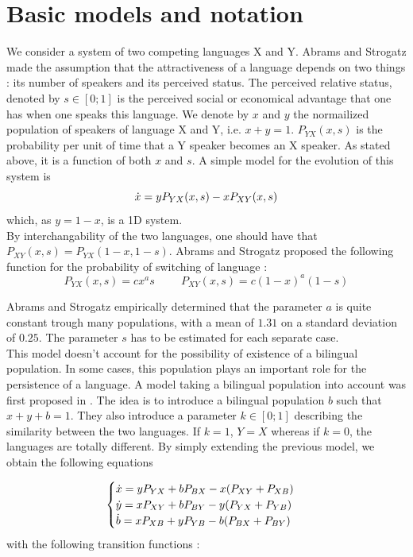 \documentclass{article}
\begin{document}
\section{Basic models and notation}
\label{sec:basic}
We consider a system of two competing languages X and Y.
Abrams and Strogatz made the assumption that the attractiveness of a language depends on two things : its number of speakers and its perceived status.
The perceived relative status, denoted by $s \in [0;1]$ is the perceived social or economical advantage that one has when one speaks this language.
We denote by $x$ and $y$ the normailized population of speakers of language X and Y, i.e. $x+y=1$. $P_{YX}(x, s)$ is the probability per unit of time that a Y speaker becomes an X speaker. As stated above, it is a function of both $x$ and $s$.
A simple model for the evolution of this system is
\begin{equation}
\label{eq:1dsimple}
\dot{x} = yP_{YX}(x, s) - xP_{XY}(x, s)
\end{equation}
which, as $y = 1-x$, is a 1D system. \\
By interchangability of the two languages, one should have that $P_{XY}(x, s) = P_{YX}(1-x, 1-s)$. Abrams and Strogatz proposed the following function for the probability of switching of language :
\[ P_{YX}(x,s) = cx^as \hspace{1cm} P_{XY}(x,s) = c(1-x)^a(1-s) \]

Abrams and Strogatz empirically determined that the parameter $a$ is quite constant trough many populations, with a mean of $1.31$ on a standard deviation of $0.25$. The parameter $s$ has to be estimated for each separate case. \\

This model doesn't account for the possibility of existence of a bilingual population.
In some cases, this population plays an important role for the persistence of a language.
A model taking a bilingual population into account was first proposed in \cite{BAGGS19939}.
The idea is to introduce a bilingual population $b$ such that $x+y+b=1$.
They also introduce a parameter $k \in [0;1]$ describing the similarity between the two languages.
If $k = 1$, $Y = X$ whereas if $k = 0$, the languages are totally different.
By simply extending the previous model, we obtain the following equations

\begin{equation}
\label{eq:bil}
\begin{cases}
\dot{x} = yP_{YX} + bP_{BX} - x(P_{XY} + P_{XB}) \\
\dot{y} = xP_{XY} + bP_{BY} - y(P_{YX} + P_{YB}) \\
\dot{b} = xP_{XB} + yP_{YB} - b(P_{BX} + P_{BY}) \\
\end{cases}
\end{equation}
with the following transition functions :
\end{document}
